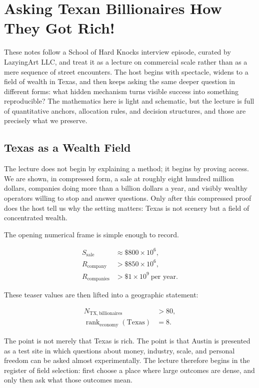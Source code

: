 \chapter{Asking Texan Billionaires How They Got Rich!}

These notes follow a School of Hard Knocks interview episode, curated by LazyingArt LLC, and treat it as a lecture on commercial scale rather than as a mere sequence of street encounters. The host begins with spectacle, widens to a field of wealth in Texas, and then keeps asking the same deeper question in different forms: what hidden mechanism turns visible success into something reproducible? The mathematics here is light and schematic, but the lecture is full of quantitative anchors, allocation rules, and decision structures, and those are precisely what we preserve.

\section{Texas as a Wealth Field}

The lecture does not begin by explaining a method; it begins by proving access. We are shown, in compressed form, a sale at roughly eight hundred million dollars, companies doing more than a billion dollars a year, and visibly wealthy operators willing to stop and answer questions. Only after this compressed proof does the host tell us why the setting matters: Texas is not scenery but a field of concentrated wealth.

The opening numerical frame is simple enough to record.

\begin{align}
S_{\mathrm{sale}} &\approx \$800\times 10^{6},\\
R_{\mathrm{company}} &> \$850\times 10^{6},\\
R_{\mathrm{companies}} &> \$1\times 10^{9}\ \text{per year}.
\end{align}

These teaser values are then lifted into a geographic statement:

\begin{align}
N_{\mathrm{TX,billionaires}} &> 80,\\
\operatorname{rank}_{\mathrm{economy}}(\mathrm{Texas}) &= 8.
\end{align}

The point is not merely that Texas is rich. The point is that Austin is presented as a test site in which questions about money, industry, scale, and personal freedom can be asked almost experimentally. The lecture therefore begins in the register of field selection: first choose a place where large outcomes are dense, and only then ask what those outcomes mean.

